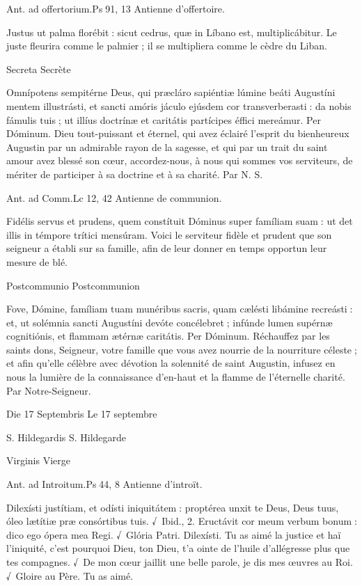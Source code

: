 \begin{paracol}{2}
Ant. ad offertorium.\hfill Ps 91, 13
\switchcolumn
Antienne d’offertoire.
\switchcolumn*

Justus ut palma florébit : sicut cedrus, quæ in Líbano est, multiplicábitur.
\switchcolumn
Le juste fleurira comme le palmier ; il se multipliera comme le cèdre du Liban.
\switchcolumn*

Secreta
\switchcolumn
Secrète
\switchcolumn*

Omnípotens sempitérne Deus,  qui præcláro sapiéntiæ lúmine beáti Augustíni mentem illustrásti, et sancti amóris jáculo ejúsdem cor transverberasti : da nobis fámulis tuis ; ut illíus doctrínæ et caritátis partícipes éffici mereámur. Per Dóminum.
\switchcolumn
Dieu tout-puissant et éternel, qui avez  éclairé l’esprit du bienheureux Augustin par un admirable rayon de la sagesse, et qui par un trait du saint amour avez blessé son cœur, accordez-nous, à nous qui sommes vos serviteurs, de mériter de participer à sa doctrine et à sa charité. Par N. S.
\switchcolumn*

Ant. ad Comm.\hfill Lc 12, 42
\switchcolumn
Antienne de communion.
\switchcolumn*

Fidélis servus et prudens, quem constítuit Dóminus super famíliam suam : ut det illis in témpore trítici mensúram.
\switchcolumn
Voici le serviteur fidèle et prudent que son seigneur a établi sur sa famille, afin de leur donner en temps opportun leur mesure de blé.
\switchcolumn*

Postcommunio
\switchcolumn
Postcommunion
\switchcolumn*

Fove, Dómine, famíliam tuam  munéribus sacris, quam cælésti libámine recreásti : et, ut solémnia sancti Augustíni devóte concélebret ; infúnde lumen supérnæ cognitiónis, et flammam ætérnæ caritátis. Per Dóminum.
\switchcolumn
Réchauffez par les saints dons, Seigneur,  votre famille que vous avez nourrie de la nourriture céleste ; et afin qu’elle célèbre avec dévotion la solennité de saint Augustin, infusez en nous la lumière de la connaissance d’en-haut et la flamme de l’éternelle charité. Par Notre-Seigneur.
\switchcolumn*

Die 17 Septembris
\switchcolumn
Le 17 septembre
\switchcolumn*

S. Hildegardis
\switchcolumn
S. Hildegarde
\switchcolumn*

Virginis
\switchcolumn
Vierge
\switchcolumn*

Ant. ad Introitum.\hfill Ps 44, 8
\switchcolumn
Antienne d’introït.
\switchcolumn*

Dilexísti justítiam, et odísti  iniquitátem : proptérea unxit te Deus, Deus tuus, óleo lætítiæ præ consórtibus tuis. √~Ibid., 2. Eructávit cor meum verbum bonum : dico ego ópera mea Regi. √~Glória Patri. Dilexísti.
\switchcolumn
Tu as aimé la justice et haï l’iniquité, c’est  pourquoi Dieu, ton Dieu, t’a ointe de l’huile d’allégresse plus que tes compagnes. √~De mon cœur jaillit une belle parole, je dis mes œuvres au Roi. √~Gloire au Père. Tu as aimé.
\switchcolumn*


\end{paracol}
